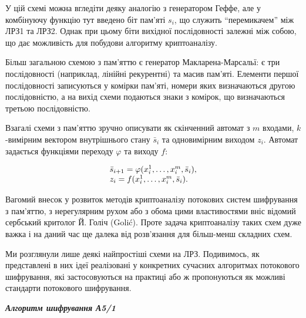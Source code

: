 У цій схемі можна вгледіти деяку аналогію з генератором Геффе, але у комбінуючу
функцію тут введено біт пам’яті  $s_i$, що служить “перемикачем” між ЛРЗ1
та ЛРЗ2. Однак при цьому біти вихідної послідовності залежні між собою, що дає
можливість для побудови алгоритму криптоаналізу.

Більш загальною схемою з пам’яттю є генератор Макларена-Марсальї: є три
послідовності (наприклад, лінійні рекурентні) та масив пам’яті. Елементи першої
послідовності записуються у комірки пам’яті, номери яких визначаються другою
послідовністю, а на вихід схеми подаються знаки з комірок, що визначаються
третьою послідовністю.

Взагалі схеми з пам’яттю зручно описувати як скінченний автомат з  $m$
входами,  $k${}-вимірним вектором внутрішнього стану  ${\bar{s}}_i$
та одновимірним виходом  $z_i$. Автомат задається функціями переходу 
$\varphi $ та виходу  $f$:

\begin{equation*}
\begin{matrix}{\bar{{s}}_{i+1}=\varphi
(x_{i}^{1},\dots,x_{i}^{m},{\bar{s}}_{i}),}\hfill\null
\\z_{i}=f(x_{i}^{1},\dots,x_{i}^{m},{\bar{s}}_{i})\text{.}\hfill\null
\end{matrix}\hfill 
\end{equation*}

\bigskip

Вагомий внесок у розвиток методів криптоаналізу потокових систем шифрування з
пам’яттю, з нерегулярним рухом або з обома цими властивостями вніс відомий
сербський критолог Й. Голіч (Golić). Проте задача криптоаналізу таких схем дуже
важка і на даний час ще далека від розв’язання для більш-менш складних схем.

Ми розглянули лише деякі найпростіші схеми на ЛРЗ. Подивимось, як представлені в
них ідеї реалізовані у конкретних сучасних алгоритмах потокового шифрування,
які застосовуються на практиці або ж пропонуються як можливі стандарти
потокового шифрування.

{\centering\bfseries\itshape
Алгоритм шифрування А5/1
\par}


\bigskip

